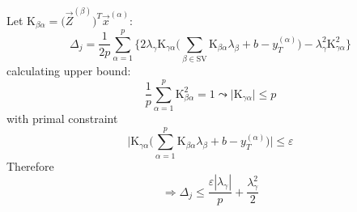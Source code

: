 Let $\mathrm{K}_{\beta\alpha} = \big( \vec{Z}^{(\beta)} \big)^T	\vec{x}^{ (\alpha) }$: 
\begin{equation}
	\Delta_j = \frac{1}{2p} \sum_{ \alpha = 1 }^p \Bigg\{
		2 \lambda_\gamma \mathrm{K}_{\gamma\alpha} 
		\bigg( \sum_{ \beta  \in \mathrm{SV} } \mathrm{K}_{\beta\alpha}
			\lambda_\beta + b - y_T^{(\alpha)} \bigg)
		- \lambda_\gamma^2 \mathrm{K}_{\gamma\alpha}^2
		\Bigg\}
\end{equation}
calculating upper bound:
\begin{equation}	
	\frac{1}{p} \sum_{\alpha = 1}^p \mathrm{K}_{\beta\alpha}^2 = 1
	\leadsto \big| \mathrm{K}_{\gamma\alpha} \big| \leq p
\end{equation}
with primal constraint
\begin{equation}
	\bigg| \mathrm{K}_{\gamma\alpha} \Big( \sum_{\alpha = 1}^p
		\mathrm{K}_{\beta\alpha} \lambda_\beta + b - y_T^{(\alpha)}
	\Big) \bigg| \leq \varepsilon
\end{equation}
Therefore
\begin{equation}
	\Rightarrow \Delta_j \leq \frac{\varepsilon | \lambda_\gamma | }{p}
		+ \frac{\lambda_\gamma^2}{2}
\end{equation}

